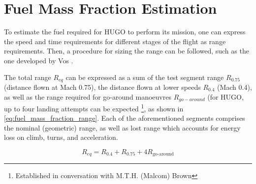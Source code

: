 \section{Fuel Mass Fraction Estimation}
\label{sec:fuel_mass_fraction_estimation}
To estimate the fuel required for HUGO to perform its mission, one can express the speed and time requirements for different stages of the flight as range requirements. Then, a procedure for sizing the range can be followed, such as the one developed by Vos \cite{Vos}. 

The total range $R_{eq}$ can be expressed as a sum of the test segment range $R_{0.75}$ (distance flown at Mach 0.75), the distance flown at lower speeds $R_{0.4}$ (Mach 0.4), as well as the range required for go-around manoeuvres $R_{go-around}$ (for HUGO, up to four landing attempts can be expected \footnote{Established in conversation with M.T.H. (Malcom) Brown}, as shown in \autoref{eq:fuel_mass_fraction_range}. Each of the aforementioned segments comprises the nominal (geometric) range, as well as lost range which accounts for energy loss on climb, turns, and acceleration.



\begin{equation}
\label{eq:fuel_mass_fraction_range}
    R_{eq} =  R_{0.4}+R_{0.75}+4R_\text{go-around}
\end{equation}

